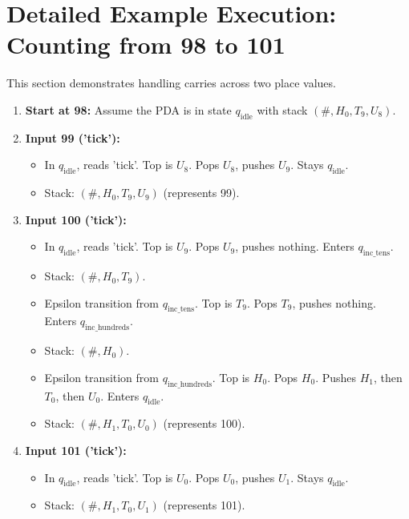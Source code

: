 \documentclass[11pt]{article}
\begin{document}
\section{Detailed Example Execution: Counting from 98 to 101} \label{sec:example_3digit}

This section demonstrates handling carries across two place values.

\begin{enumerate}
    \item \textbf{Start at 98:} Assume the PDA is in state $q_{\text{idle}}$ with stack $(\#, H_0, T_9, U_8)$.
    \item \textbf{Input 99 ('tick'):}
        \begin{itemize}
            \item In $q_{\text{idle}}$, reads 'tick'. Top is $U_8$. Pops $U_8$, pushes $U_9$. Stays $q_{\text{idle}}$.
            \item Stack: $(\#, H_0, T_9, U_9)$ (represents 99).
        \end{itemize}
    \item \textbf{Input 100 ('tick'):}
        \begin{itemize}
            \item In $q_{\text{idle}}$, reads 'tick'. Top is $U_9$. Pops $U_9$, pushes nothing. Enters $q_{\text{inc\_tens}}$.
            \item Stack: $(\#, H_0, T_9)$.
            \item Epsilon transition from $q_{\text{inc\_tens}}$. Top is $T_9$. Pops $T_9$, pushes nothing. Enters $q_{\text{inc\_hundreds}}$.
            \item Stack: $(\#, H_0)$.
            \item Epsilon transition from $q_{\text{inc\_hundreds}}$. Top is $H_0$. Pops $H_0$. Pushes $H_1$, then $T_0$, then $U_0$. Enters $q_{\text{idle}}$.
            \item Stack: $(\#, H_1, T_0, U_0)$ (represents 100).
        \end{itemize}
    \item \textbf{Input 101 ('tick'):}
        \begin{itemize}
            \item In $q_{\text{idle}}$, reads 'tick'. Top is $U_0$. Pops $U_0$, pushes $U_1$. Stays $q_{\text{idle}}$.
            \item Stack: $(\#, H_1, T_0, U_1)$ (represents 101).
        \end{itemize}
\end{enumerate}
\end{document}
